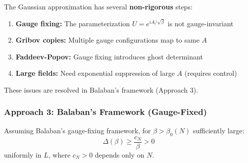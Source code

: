 \begin{remark}
\label{rmk:gaussian-issues}
The Gaussian approximation has several \textbf{non-rigorous} steps:
\begin{enumerate}
\item \textbf{Gauge fixing:} The parameterization $U = e^{iA/\sqrt{\beta}}$ is not gauge-invariant
\item \textbf{Gribov copies:} Multiple gauge configurations map to same $A$
\item \textbf{Faddeev-Popov:} Gauge fixing introduces ghost determinant
\item \textbf{Large fields:} Need exponential suppression of large $A$ (requires control)
\end{enumerate}

These issues are resolved in Balaban's framework (Approach 3).
\end{remark}

\subsubsection{Approach 3: Balaban's Framework (Gauge-Fixed)}

\begin{theorem}
\label{thm:weak-balaban}
Assuming Balaban's gauge-fixing framework, for $\beta > \beta_0(N)$ sufficiently large:
\[
\Delta(\beta) \geq \frac{c_N}{\beta} > 0
\]
uniformly in $L$, where $c_N > 0$ depends only on $N$.
\end{theorem}

